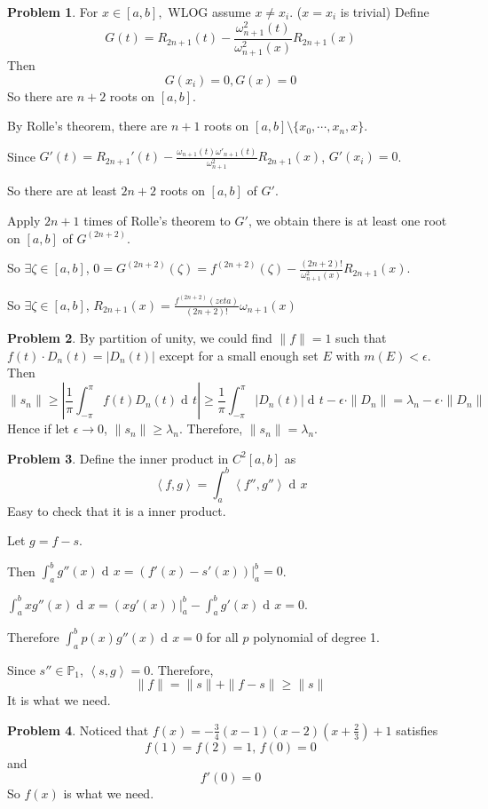 \documentclass[a4paper]{article}
\theoremstyle{definition}
\newtheorem{problem}{Problem}
\theoremstyle{plain}
\newcommand{\Pbb}{\mathbb P}
\newcommand{\dps}{\displaystyle}
\newcommand{\<}{\left<}
\renewcommand{\>}{\right>}
\numberwithin{equation}{problem}
\DeclareMathOperator{\dd}{d\!}
\begin{document}
\begin{problem}
    For  $ x\in [a,b], $ WLOG assume  $ x\neq x_i $. ($ x=x_i $ is trivial)
    Define 
    \[G(t)=R_{2n+1}(t)-\frac{\omega_{n+1}^2(t)}{\omega^2_{n+1}(x)}R_{2n+1}(x)\]
    Then 
    \[G(x_i)=0,G(x)=0\]
    So there are   $ n+2 $ roots on  $ [a,b] $.
    
    By Rolle's theorem, there are  $ n+1 $ roots on  $ [a,b]\setminus\{x_0,\cdots,x_n,x\} $.
    
    Since  $ G'(t)=R_{2n+1}'(t)-\frac{\omega_{n+1}(t)\omega'_{n+1}(t)}{\omega^2_{n+1}}R_{2n+1}(x) $,  $ G'(x_i)=0 $.
    
    So there are at least $ 2n+2 $ roots on $ [a,b] $ of  $ G' $.
    
    Apply  $ 2n+1 $ times of Rolle's theorem to  $ G' $, we obtain there is at least one root on  $ [a,b] $  of  $ G^{(2n+2)} $.

    So  $ \exists \zeta\in [a,b] $,  $ 0=G^{(2n+2)}(\zeta)=f^{(2n+2)}(\zeta)-\frac{(2n+2)!}{\omega_{n+1}^2(x)}R_{2n+1}(x) $.
    
    So  $ \exists \zeta\in [a,b] $,   $ R_{2n+1}(x)=\dps\frac{f^{(2n+2)}(zeta)}{(2n+2)!}\omega_{n+1}(x) $ 
\end{problem}

\begin{problem}
    By partition of unity, we could find  $ \|f\|=1 $ such that  $ f(t)\cdot D_n(t)=|D_n(t)| $ except for a small enough set  $ E $ with  $ m(E)<\epsilon $.
    Then   
    \[\|s_n\| \geq |\frac{1}{\pi}\int_{-\pi}^{\pi}f(t)D_n(t)\dd t| \geq \frac{1}{\pi}\int_{-\pi}^\pi |D_n(t)|\dd t -\epsilon\cdot \|D_n\| =\lambda_n-\epsilon \cdot \|D_n\|\]
    Hence if let  $ \epsilon\rightarrow 0 $,  $ \|s_n\| \geq \lambda_n $. Therefore,  $ \|s_n\|=\lambda_n $.   
\end{problem}
\begin{problem}
    Define the inner product in  $ C^2[a,b] $  as 
    \[\<f,g\>=\int_a^b\<f'',g''\>\dd x\]
    Easy to check that it is  a inner product.

    Let  $ g=f-s $.
    
    Then  $ \dps\int_a^b g''(x)\dd x=\left.(f'(x)-s'(x))\right|_a^b=0 $.
    
     $ \dps\int_a^b xg''(x)\dd x=\left.(xg'(x))\right|_a^b-\int_a^b g'(x)\dd x=0 $.
     
     Therefore  $ \dps\int_a^b p(x) g''(x)\dd x=0$ for all  $ p $ polynomial of degree 1.
     
     Since  $ s''\in \Pbb_1 $,  $ \<s,g\>=0 $. Therefore, 
     \[\|f\|=\|s\|+\|f-s\| \geq \|s\|\]
     It is what we need.  
\end{problem}

\begin{problem}
    Noticed that  $ f(x)=-\frac{3}{4}(x-1)(x-2)(x+\frac{2}{3})+1 $ satisfies 
    \[f(1)=f(2)=1,\,f(0)=0\]
    and  
    \[f'(0)=0\]
    So  $ f(x) $ is what we need.
\end{problem}
\end{document}
